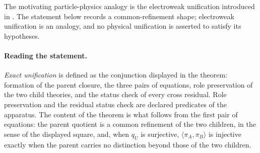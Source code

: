 The motivating particle-physics analogy is the electroweak unification
introduced in \citet{Weinberg1967Leptons}.  The statement below records a common-refinement shape; electroweak unification is an analogy, and no physical unification is asserted to satisfy its hypotheses.

\paragraph{Reading the statement.}
\emph{Exact unification} is defined as the conjunction displayed in the
theorem: formation of the parent closure, the three pairs of equations, role
preservation of the two child theories, and the status check of every cross
residual. Role preservation and the residual status check are declared
predicates of the apparatus. The content of the theorem is what follows from
the first pair of equations: the parent quotient is a common refinement of the
two children, in the sense of the displayed square, and, when \(q_U\) is
surjective, \(\langle\pi_A,\pi_B\rangle\) is injective exactly when the parent
carries no distinction beyond those of the two children.


